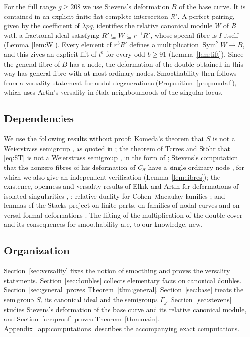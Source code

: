 \documentclass{amsart}
\theoremstyle{definition}
\theoremstyle{remark}
\numberwithin{equation}{section}
\DeclareMathOperator{\Sym}{Sym}
\begin{document}
For the full range $g\ge 208$ we use Stevens's deformation $B$ of the base curve. It is contained in an explicit finite flat complete intersection $R'$. A perfect pairing, given by the coefficient of $\lambda pq$, identifies the relative canonical module $W$ of $B$ with a fractional ideal satisfying $R'\subseteq W\subseteq r^{-1}R'$, whose special fibre is $I$ itself (Lemma~\ref{lem:W}). Every element of $r^3R'$ defines a multiplication $\Sym^2W\to B$, and this gives an explicit lift of $t^b$ for every odd $b\ge 91$ (Lemma~\ref{lem:lift}). Since the general fibre of $B$ has a node, the deformation of the double obtained in this way has general fibre with at most ordinary nodes. Smoothability then follows from a versality statement for nodal degenerations (Proposition~\ref{prop:nodal}), which uses Artin's versality in \'etale neighbourhoods of the singular locus.

\subsection*{Dependencies}
We use the following results without proof: Komeda's theorem that $S$ is not a Weierstrass semigroup \cite[Example~5.1]{Kom}, as quoted in \cite[Example~2.13]{Ste}; the theorem of Torres and St\"ohr that \eqref{eq:ST} is not a Weierstrass semigroup \cite[p.~48, proof of Scholium~3.5 and Remark~3.6]{Tor}, in the form of \cite[\S 4.1]{Ste}; Stevens's computation that the nonzero fibres of his deformation of $C_S$ have a single ordinary node \cite[Example~2.13]{Ste}, for which we also give an independent verification (Lemma~\ref{lem:fibres}); the existence, openness and versality results of Elkik and Artin for deformations of isolated singularities \cite{Elk}, \cite[Corollary~3.2, Theorems~3.3 and~4.4, Example~4.5]{Art}; relative duality for Cohen--Macaulay families \cite[(A.7) and (A.8)]{dJvS}; and lemmas of the Stacks project on finite parts, on families of nodal curves and on versal formal deformations \cite{Sta}. The lifting of the multiplication of the double cover and its consequences for smoothability are, to our knowledge, new.

\subsection*{Organization}
Section~\ref{sec:versality} fixes the notion of smoothing and proves the versality statements. Section~\ref{sec:doubles} collects elementary facts on canonical doubles. Section~\ref{sec:general} proves Theorem~\ref{thm:general}. Section~\ref{sec:base} treats the semigroup $S$, its canonical ideal and the semigroups $\Gamma_g$. Section~\ref{sec:stevens} studies Stevens's deformation of the base curve and its relative canonical module, and Section~\ref{sec:proof} proves Theorem~\ref{thm:main}. Appendix~\ref{app:computations} describes the accompanying exact computations.
\end{document}
